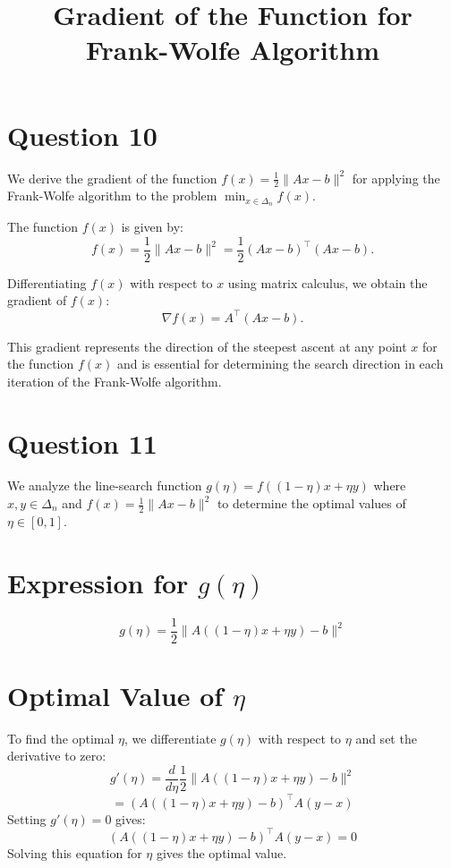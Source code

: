\documentclass[12p]{article}
\begin{document}
\section*{Question 10} 


\title{Gradient of the Function for Frank-Wolfe Algorithm}
\maketitle

We derive the gradient of the function \( f(x) = \frac{1}{2} \|Ax - b\|^2 \) for applying the Frank-Wolfe algorithm to the problem \( \min_{x \in \Delta_n} f(x) \).

The function \( f(x) \) is given by:
\[ f(x) = \frac{1}{2} \|Ax - b\|^2 = \frac{1}{2} (Ax - b)^\top (Ax - b). \]

Differentiating \( f(x) \) with respect to \( x \) using matrix calculus, we obtain the gradient of \( f(x) \):
\[ \nabla f(x) = A^\top (Ax - b). \]

This gradient represents the direction of the steepest ascent at any point \( x \) for the function \( f(x) \) and is essential for determining the search direction in each iteration of the Frank-Wolfe algorithm.


\section*{Question 11} 

We analyze the line-search function \( g(\eta) = f((1 - \eta)x + \eta y) \) where \( x, y \in \Delta_n \) and \( f(x) = \frac{1}{2}\|Ax - b\|^2 \) to determine the optimal values of \( \eta \in [0, 1] \).

\section*{Expression for \( g(\eta) \)}
\[ g(\eta) = \frac{1}{2} \|A((1 - \eta)x + \eta y) - b\|^2 \]

\section*{Optimal Value of \( \eta \)}
To find the optimal \(\eta\), we differentiate \(g(\eta)\) with respect to \(\eta\) and set the derivative to zero:
\[ g'(\eta) = \frac{d}{d\eta} \frac{1}{2} \|A((1 - \eta)x + \eta y) - b\|^2 \]
\[ = (A((1 - \eta)x + \eta y) - b)^\top A(y - x) \]
Setting \( g'(\eta) = 0 \) gives:
\[ (A((1 - \eta)x + \eta y) - b)^\top A(y - x) = 0 \]
Solving this equation for \(\eta\) gives the optimal value.
\end{document}
